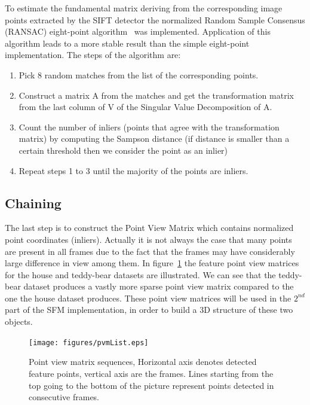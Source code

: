 To estimate the fundamental matrix deriving from the corresponding image points extracted by the SIFT detector the normalized Random Sample Consensus (RANSAC) eight-point algorithm~\cite{eight-point} was implemented. Application of this algorithm leads to a more stable result than the simple eight-point implementation. The steps of the algorithm are:

\begin{enumerate}[1]
  \item Pick 8 random matches from the list of the corresponding points.
  \item Construct a matrix A from the matches and get the transformation matrix from the last column of V of the Singular Value Decomposition of A.
  \item Count the number of inliers (points that agree with the transformation matrix) by computing the Sampson distance (if distance is smaller than a certain threshold then we consider the point as an inlier)
  \item Repeat steps 1 to 3 until the majority of the points are inliers.
\end{enumerate}


\subsection{Chaining}
The last step is to construct the Point View Matrix which contains normalized point coordinates (inliers). Actually it is not always the case that many points are present in all frames due to the fact that the frames may have considerably large difference in view among them. In figure~\ref{fig:pointMatching} the feature point view matrices for the house and teddy-bear datasets are illustrated. We can see that the teddy-bear dataset produces a vastly more sparse point view matrix compared to the one the house dataset produces. These point view matrices will be used in the $2^{nd}$ part of the SFM implementation, in order to build a 3D structure of these two objects.

\begin{figure}[ht!]
  \centering
    \texttt{[image: figures/pvmList.eps]}
    \caption{Point view matrix sequences, Horizontal axis denotes detected feature points, vertical axis are the frames. Lines starting from the top going to the bottom of the picture represent points detected in consecutive frames.}
    \label{fig:pointMatching}
\end{figure}

